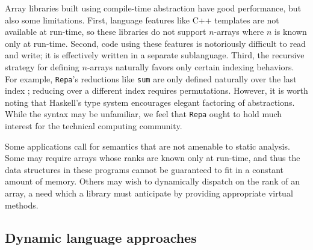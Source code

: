 \documentclass{sigplanconf}
\newcommand{\code}[1]{\texttt{#1}}
\begin{document}
Array libraries built using compile-time abstraction have good performance,
but also some limitations.
First, language features like C++ templates are not available at run-time, so these
libraries do not support $n$-arrays where $n$ is known only at run-time.
Second, code using these features is
notoriously difficult to read and write; it is effectively written in a
separate sublanguage.
Third, the recursive strategy for defining $n$-arrays
naturally favors only certain indexing behaviors. For example,
\code{Repa}'s reductions like \code{sum} are only defined naturally over the
last index \cite{Keller:2010rs}; reducing over a different index requires
permutations.
However, it is worth noting that Haskell's type system encourages
elegant factoring of abstractions. While the syntax may be unfamiliar,
we feel that \code{Repa} ought to hold much interest for the technical computing
community.

Some applications call for semantics that are not amenable
to static analysis. Some may require arrays whose ranks are known
only at run-time, and thus the data structures in these programs cannot be
guaranteed to fit in a constant amount of memory. Others may
wish to dynamically dispatch on the rank of an array, a need which a
library must anticipate by providing appropriate virtual methods.


\subsection{Dynamic language approaches}
\end{document}
